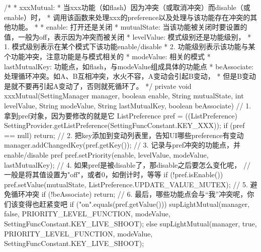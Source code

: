 \documentclass[a4paper,11pt]{article}
\begin{document}
\begin{javacode}
/*
 * xxxMutual:
 *    当xxx功能（如flash）因为冲突（或取消冲突）而disable（或enable）时，
 *    调用该函数来处理xxx的preference以及处理与该功能存在冲突的其他功能。
 *
 * enable: 打开还是关闭
 * mutualState: 当该功能被关闭时要设置的值，一般为off，表示因为冲突而被关闭
 * levelValue: 模式级别还是功能级别，
 *     1. 模式级别表示在某个模式下该功能enable/disable
 *     2. 功能级别表示该功能与某个功能冲突，注意功能是与模式相关的
 * modeValue: 相关的模式
 * lastMutualKey: 功能点，如flash，与modeValue组成具体的功能点
 * beAssociate: 处理循环冲突。如A、B互相冲突，水火不容，A变动会引起B变动，
 *     但是B变动是就不要再引起A变动了，否则就死循环了。
 */
private void xxxMutual(SettingManager manager, boolean enable, String mutualState,
    int levelValue, String modeValue, String lastMutualKey, boolean beAssociate) {
    // 1. 拿到pref对象，因为要修改的就是它
    ListPreference pref = ((ListPreference)
                SettingProvider.getListPreference(SettingFuncConstant.KEY_XXX));
    if (pref == null)
        return;
    // 2. 把key添加到变动列表里，告知UI哪些preference有变动
    manager.addChangedKey(pref.getKey());
    // 3. 记录与pref冲突的功能点，并enable/disable pref
    pref.setPriority(enable, levelValue, modeValue, lastMutualKey);
    // 4. 如果pref是被disable了，那disable之后要怎么变化呢，
    //    一般是将其值设置为"off"，或者0，如倒计时，等等
    if (!pref.isEnable()) {
        pref.setValue(mutualState, ListPreference.UPDATE_VALUE_MUTEX);
    }
    // 5. 避免循环冲突
    if (!beAssociate)
        return;
    // 6. 最后，哪些功能点会与“我”冲突呢，你们该变得也赶紧变吧
    if ("on".equals(pref.getValue())) {
        supLightMutual(manager, false, PRIORITY_LEVEL_FUNCTION, modeValue,
                       SettingFuncConstant.KEY_LIVE_SHOOT);
    } else {
        supLightMutual(manager, true, PRIORITY_LEVEL_FUNCTION, modeValue,
                       SettingFuncConstant.KEY_LIVE_SHOOT);
    }
}
\end{javacode}
\end{document}
